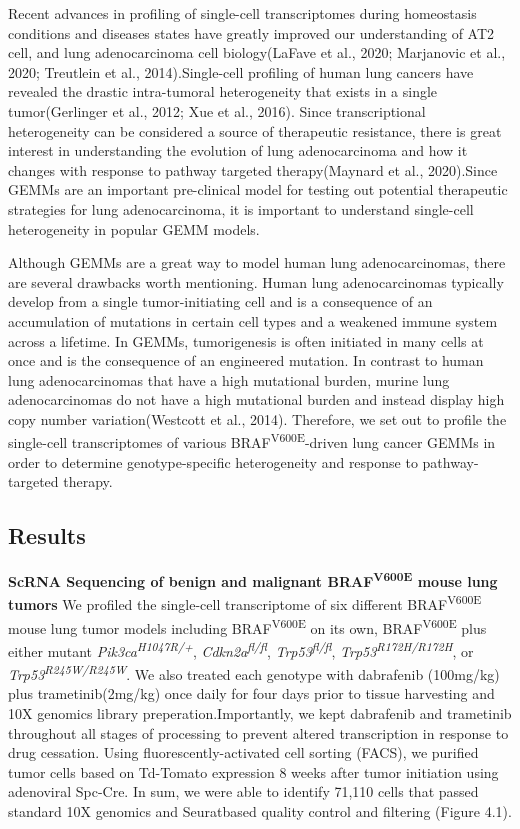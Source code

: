 Recent advances in profiling of single-cell transcriptomes during homeostasis conditions and diseases states have greatly improved our understanding of AT2 cell, and lung adenocarcinoma cell biology(LaFave et al., 2020; Marjanovic et al., 2020; Treutlein et al., 2014).Single-cell profiling of human lung cancers have revealed the drastic intra-tumoral heterogeneity that exists in a single tumor(Gerlinger et al., 2012; Xue et al., 2016). Since transcriptional heterogeneity can be considered a source of therapeutic resistance, there is great interest in understanding the evolution of lung adenocarcinoma and how it changes with response to pathway targeted therapy(Maynard et al., 2020).Since GEMMs are an important pre-clinical model for testing out potential therapeutic strategies for lung adenocarcinoma, it is important to understand single-cell heterogeneity in popular GEMM models.

Although GEMMs are a great way to model human lung adenocarcinomas, there are several drawbacks worth mentioning. Human lung adenocarcinomas typically develop from a single tumor-initiating cell and is a consequence of an accumulation of mutations in certain cell types and a weakened immune system across a lifetime. In GEMMs, tumorigenesis is often initiated in many cells at once and is the consequence of an engineered mutation. In contrast to human lung adenocarcinomas that have a high mutational burden, murine lung adenocarcinomas do not have a high mutational burden and instead display high copy number variation(Westcott et al., 2014). Therefore, we set out to profile the single-cell transcriptomes of various BRAF\textsuperscript{V600E}-driven lung cancer GEMMs in order to determine genotype-specific heterogeneity and response to pathway-targeted therapy.

\hypertarget{results-2}{%
\subsection{Results}\label{results-2}}

\textbf{ScRNA Sequencing of benign and malignant BRAF\textsuperscript{V600E} mouse lung tumors}
We profiled the single-cell transcriptome of six different BRAF\textsuperscript{V600E} mouse lung tumor models including BRAF\textsuperscript{V600E} on its own, BRAF\textsuperscript{V600E} plus either mutant \emph{Pik3ca\textsuperscript{H1047R/+}}, \emph{Cdkn2a\textsuperscript{fl/fl}}, \emph{Trp53\textsuperscript{fl/fl}}, \emph{Trp53\textsuperscript{R172H/R172H}}, or \emph{Trp53\textsuperscript{R245W/R245W}}. We also treated each genotype with dabrafenib (100mg/kg) plus trametinib(2mg/kg) once daily for four days prior to tissue harvesting and 10X genomics library preperation.Importantly, we kept dabrafenib and trametinib throughout all stages of processing to prevent altered transcription in response to drug cessation. Using fluorescently-activated cell sorting (FACS), we purified tumor cells based on Td-Tomato expression 8 weeks after tumor initiation using adenoviral Spc-Cre. In sum, we were able to identify 71,110 cells that passed standard 10X genomics and Seuratbased quality control and filtering (Figure 4.1).

